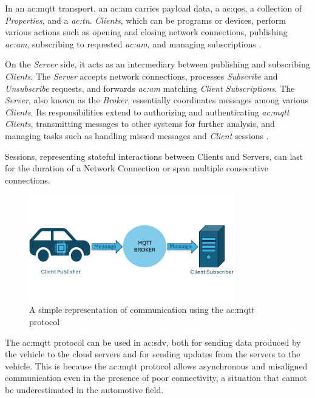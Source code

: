 \begin{itemize}
    In an \gls{ac:mqtt} transport, an \gls{ac:am} carries payload data, a \gls{ac:qos}, a collection of \textit{Properties}, and a \textit{\gls{ac:tn}}. \textit{Clients}, which can be programs or devices, perform various actions such as opening and closing network connections, publishing \textit{\gls{ac:am}}, subscribing to requested \textit{\gls{ac:am}}, and managing subscriptions \cite{MQTTVersion5.0}.

    On the \textit{Server} side, it acts as an intermediary between publishing and subscribing \textit{Clients}. The \textit{Server} accepts network connections, processes \textit{Subscribe} and \textit{Unsubscribe} requests, and forwards \textit{\gls{ac:am}} matching \textit{Client Subscriptions}. The \textit{Server}, also known as the \textit{Broker}, essentially coordinates messages among various \textit{Clients}. Its responsibilities extend to authorizing and authenticating \textit{\gls{ac:mqtt} Clients}, transmitting messages to other systems for further analysis, and managing tasks such as handling missed messages and \textit{Client} sessions \cite{MQTTAWS}.

    Sessions, representing stateful interactions between Clients and Servers, can last for the duration of a Network Connection or span multiple consecutive connections.
     \begin{figure}[h]  %
        \centering
        \includegraphics[width=0.8\textwidth]{images/MQTTProtocol.png}  %
        \caption{A simple representation of communication using the \gls{ac:mqtt} protocol}
        \label{fig:MQTTProtocol}
    \end{figure}

    The \gls{ac:mqtt} protocol can be used in \gls{ac:sdv}, both for sending data produced by the vehicle to the cloud servers and for sending updates from the servers to the vehicle. This is because the \gls{ac:mqtt} protocol allows asynchronous and misaligned communication even in the presence of poor connectivity, a situation that cannot be underestimated in the automotive field.
\end{itemize}

